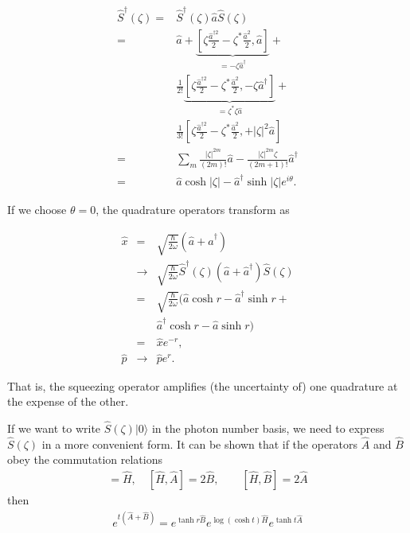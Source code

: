 \documentclass[pra,
superscriptaddress,
 amsmath,amssymb,
 aps,twocolumn]{revtex4-1}
\newcommand{\ket}[1]{|{#1}\rangle}
\begin{document}
% 
\begin{align} \displaystyle
\hat S^\dagger(\zeta) =& \hat S^\dagger(\zeta) \hat a  \hat  S(\zeta) \nonumber\\
					  =& \hat  a + \underbrace{[ \zeta \frac{\hat a^{\dagger2}}{2}-\zeta^*\frac{\hat  a^2}{2}, \hat a  ]}
					  _{= -\zeta\hat   a^\dagger}  + \nonumber\\
% 
					  & \frac{1}{2!} \underbrace{[\zeta \frac{\hat  a^{\dagger2} }{2}-\zeta^*\frac{ \hat  a^2}{2}, -\zeta \hat a^\dagger]}_{= \zeta^* \zeta \hat  a} + \nonumber\\
					  & \frac{1}{3!}
					  [\zeta \frac{\hat  a^{\dagger2} }{2}-\zeta^*\frac{\hat  a^2}{2}, +|\zeta|^2 \hat  a] \nonumber\\
					 =& \sum_m \frac{|\zeta|^{2m}}{(2m)!} \hat  a -  \frac{|\zeta|^{2m} \zeta}{(2m+1)!} \hat a^\dagger  \nonumber\\
					 =& \hat a \cosh|\zeta| -\hat  a^\dagger \sinh |\zeta| e^{i \theta}.
\end{align}

If we choose $\theta = 0$, the quadrature operators transform as

\begin{eqnarray}
\hat x  &=& \sqrt{\frac{\hbar}{2 \omega}} (\hat a+\hat a^\dagger) \\
    &\rightarrow& 
   \sqrt{\frac{\hbar}{2 \omega}}\hat    S^\dagger(\zeta) (\hat a+ \hat a^\dagger) \hat S(\zeta)\\
  &=&\sqrt{\frac{\hbar}{2 \omega}}  (\hat a \cosh r - \hat a^\dagger  \sinh r +\\
                                  & &\hat a^\dagger \cosh r - \hat a  \sinh r)\\
   &=&\hat x e^{-r},\\
\hat p &\rightarrow& \hat p e^{r}.
\end{eqnarray}

\noindent That is, the squeezing operator amplifies (the uncertainty of) one quadrature at the expense of the other.


If we want to write $\hat S(\zeta)\ket{0}$ in the photon number basis, we need to express $\hat S(\zeta)$ in a more convenient form. It can be shown \cite{bib:helgason1962differential} that if the operators $\hat A$ and $\hat B$ obey the commutation relations 
\begin{eqnarray}
[\hat A,\hat B] = \hat H, \quad [\hat H,\hat A] = 2 \hat B, \qquad [\hat H, \hat B] = 2 \hat A
\end{eqnarray}
% 
\noindent then
\begin{eqnarray}
e^{t(\hat A+\hat B)} = e^{\tanh r \hat B} e^{\log(\cosh t) \hat H } e^{\tanh t \hat A }
\end{eqnarray}
\end{document}
